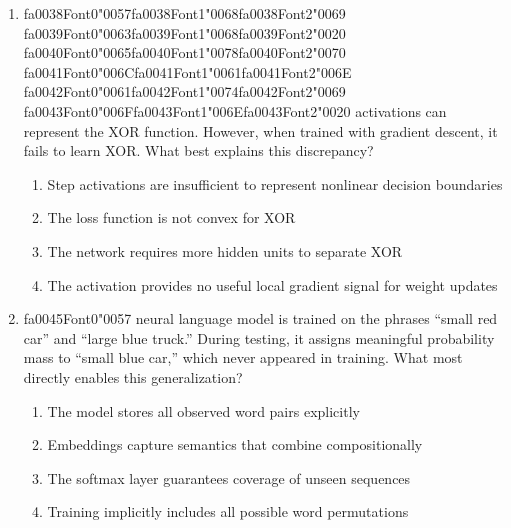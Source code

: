 \documentclass[12pt]{article}
\begin{document}
\begin{enumerate}[label=Q\arabic*.]
 \begin{enumerate}[label=(\Alph*)]
     \item It removes independence assumptions
     \item It restricts conditioning context
     \item It increases vocabulary size
     \item It enforces smoothing
 \end{enumerate}
 
 \item {\csname fa0038Font0\endcsname\char"0057}{\csname fa0038Font1\endcsname\char"0068}{\csname fa0038Font2\endcsname\char"0069} {\csname fa0039Font0\endcsname\char"0063}{\csname fa0039Font1\endcsname\char"0068}{\csname fa0039Font2\endcsname\char"0020} {\csname fa0040Font0\endcsname\char"0065}{\csname fa0040Font1\endcsname\char"0078}{\csname fa0040Font2\endcsname\char"0070} {\csname fa0041Font0\endcsname\char"006C}{\csname fa0041Font1\endcsname\char"0061}{\csname fa0041Font2\endcsname\char"006E} {\csname fa0042Font0\endcsname\char"0061}{\csname fa0042Font1\endcsname\char"0074}{\csname fa0042Font2\endcsname\char"0069} {\csname fa0043Font0\endcsname\char"006F}{\csname fa0043Font1\endcsname\char"006E}{\csname fa0043Font2\endcsname\char"0020} activations can represent the XOR function. However, when trained with gradient descent, it fails to learn XOR. What best explains this discrepancy?
 \begin{enumerate}[label=(\Alph*)]
     \item Step activations are insufficient to represent nonlinear decision boundaries
     \item The loss function is not convex for XOR
     \item The network requires more hidden units to separate XOR
     \item The activation provides no useful local gradient signal for weight updates
 \end{enumerate}
 
 \item {\csname fa0045Font0\endcsname\char"0057} neural language model is trained on the phrases ``small red car'' and ``large blue truck.'' During testing, it assigns meaningful probability mass to ``small blue car,'' which never appeared in training. What most directly enables this generalization?
 \begin{enumerate}[label=(\Alph*)]
     \item The model stores all observed word pairs explicitly
     \item Embeddings capture semantics that combine compositionally
     \item The softmax layer guarantees coverage of unseen sequences
     \item Training implicitly includes all possible word permutations
 \end{enumerate}
 

\end{enumerate}
\end{document}
